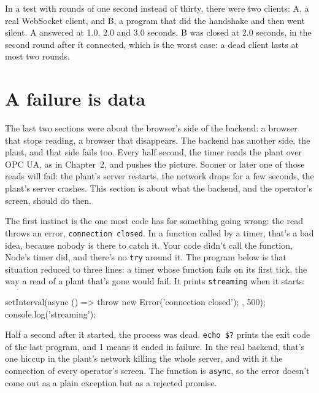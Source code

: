 In a test with rounds of one second instead of thirty, there were two clients:
A, a real WebSocket client, and B, a program that did the handshake and then
went silent. A answered at 1.0, 2.0 and 3.0 seconds. B was closed at 2.0 seconds, in
the second round after it connected, which is the worst case: a dead client
lasts at most two rounds.

\section{A failure is data}

The last two sections were about the browser's side of the backend: a browser
that stops reading, a browser that disappears. The backend has another side,
the plant, and that side fails too. Every half second, the timer reads the plant
over OPC UA, as in Chapter~2, and pushes the picture. Sooner or later one of
those reads will fail: the plant's server restarts, the network drops for a few
seconds, the plant's server crashes. This section is about what the backend,
and the operator's screen, should do then.

The first instinct is the one most code has for something going wrong: the read
throws an error, \texttt{connection closed}. In a function called by a timer,
that's a bad idea, because nobody is there to catch it. Your code didn't call
the function, Node's timer did, and there's no \texttt{try} around it. The
program below is that situation reduced to three lines: a timer whose function
fails on its first tick, the way a read of a plant that's gone would fail. It
prints \texttt{streaming} when it starts:

\begin{code}
setInterval(async () => {
  throw new Error('connection closed');
}, 500);
console.log('streaming');
\end{code}


Half a second after it started, the process was dead. \texttt{echo \$?} prints
the exit code of the last program, and 1 means it ended in failure. In the real
backend, that's one hiccup in the plant's network killing the whole server, and
with it the connection of every operator's screen. The function is
\texttt{async}, so the error doesn't come out as a plain exception but as a
rejected promise.


